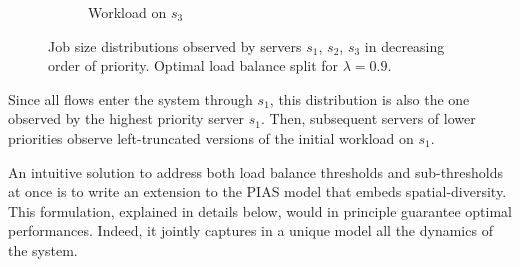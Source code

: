 \begin{figure}
\begin{subfigure}{.3\textwidth}
		\caption{Workload on $s_3$}
		\label{fig:lowp-cdf}
	\end{subfigure}
	\caption{Job size distributions observed by servers $s_1$, $s_2$, $s_3$ in decreasing order of priority. Optimal load balance split for $\lambda=0.9$.}
	\label{fig:sd-spine-distribution}
\end{figure}
Since all flows enter the system through $s_1$, this distribution is also the one observed by the highest priority server $s_1$. Then, subsequent servers of lower priorities observe left-truncated versions of the initial workload on $s_1$. 


An intuitive solution to address both load balance thresholds and sub-thresholds at once is to write an extension to the PIAS model that embeds spatial-diversity. This formulation, explained in details below, would in principle guarantee optimal performances. Indeed, it jointly captures in a unique model all the dynamics of the system.
